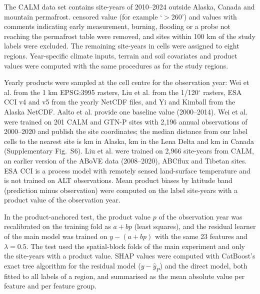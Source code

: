 \documentclass[pdflatex,sn-nature]{sn-jnl}
\begin{document}
The CALM data set\cite{Streletskiy2025} contains \nextRawSy{} site-years of 2010--2024 outside Alaska, Canada and mountain permafrost. \nextCens{} censored value (for example `$>$260') and \nextQcRm{} values with comments indicating early measurement, burning, flooding or a probe not reaching the permafrost table were removed, and sites within 100 km of the study labels were excluded. The remaining \nextcy{} site-years in \nextcells{} cells were assigned to eight regions. Year-specific climate inputs, terrain and soil covariates and product values were computed with the same procedures as for the study regions.

Yearly products were sampled at the cell centre for the observation year: Wei et al.\cite{Wei2026} from the 1 km EPSG:3995 rasters, Liu et al.\cite{Liu2024} from the 1/120$^\circ$ rasters, ESA CCI v4 and v5\cite{Westermann2024,Westermann2025} from the yearly NetCDF files, and Yi and Kimball\cite{YiKimball2019} from the Alaska NetCDF. Aalto et al.\cite{Aalto2018} provide one baseline value (2000--2014). Wei et al. were trained on 201 CALM and GTN-P sites with 2,196 annual observations of 2000--2020 and publish the site coordinates; the median distance from our label cells to the nearest site is \ndistweiAkmed{} km in Alaska, \ndistweiLemed{} km in the Lena Delta and \ndistweiCamed{} km in Canada (Supplementary Fig.~S6). Liu et al. were trained on 2,966 site-years from CALM, an earlier version of the ABoVE data (2008--2020), ABCflux and Tibetan sites. ESA CCI is a process model with remotely sensed land-surface temperature and is not trained on ALT observations. Mean product biases by latitude band (prediction minus observation) were computed on the label site-years with a product value of the observation year.

In the product-anchored test, the product value $p$ of the observation year was recalibrated on the training fold as $a+bp$ (least squares), and the residual learner of the main model was trained on $y-(a+bp)$ with the same 23 features and $\lambda=0.5$. The test used the spatial-block folds of the main experiment and only the site-years with a product value. SHAP values\cite{Lundberg2017} were computed with CatBoost's exact tree algorithm for the residual model ($y-\hat{y}_P$) and the direct model, both fitted to all labels of a region, and summarised as the mean absolute value per feature and per feature group.
\end{document}
